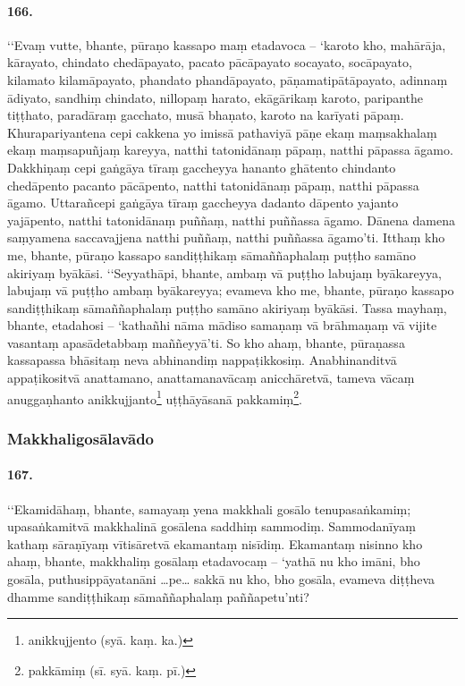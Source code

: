 \paragraph{166.} ‘‘Evaṃ vutte, bhante, pūraṇo kassapo maṃ etadavoca – ‘karoto kho, mahārāja, kārayato, chindato chedāpayato, pacato pācāpayato socayato, socāpayato, kilamato kilamāpayato, phandato phandāpayato, pāṇamatipātāpayato, adinnaṃ ādiyato, sandhiṃ chindato, nillopaṃ harato, ekāgārikaṃ karoto, paripanthe tiṭṭhato, paradāraṃ gacchato, musā bhaṇato, karoto na karīyati pāpaṃ. Khurapariyantena cepi cakkena yo imissā pathaviyā pāṇe ekaṃ maṃsakhalaṃ ekaṃ maṃsapuñjaṃ kareyya, natthi tatonidānaṃ pāpaṃ, natthi pāpassa āgamo. Dakkhiṇaṃ cepi gaṅgāya tīraṃ gaccheyya hananto ghātento chindanto chedāpento pacanto pācāpento, natthi tatonidānaṃ pāpaṃ, natthi pāpassa āgamo. Uttarañcepi gaṅgāya tīraṃ gaccheyya dadanto dāpento yajanto yajāpento, natthi tatonidānaṃ puññaṃ, natthi puññassa āgamo. Dānena damena saṃyamena saccavajjena natthi puññaṃ, natthi puññassa āgamo’ti. Itthaṃ kho me, bhante, pūraṇo kassapo sandiṭṭhikaṃ sāmaññaphalaṃ puṭṭho samāno akiriyaṃ byākāsi. ‘‘Seyyathāpi, bhante, ambaṃ vā puṭṭho labujaṃ byākareyya, labujaṃ vā puṭṭho ambaṃ byākareyya; evameva kho me, bhante, pūraṇo kassapo sandiṭṭhikaṃ sāmaññaphalaṃ puṭṭho samāno akiriyaṃ byākāsi. Tassa mayhaṃ, bhante, etadahosi – ‘kathañhi nāma mādiso samaṇaṃ vā brāhmaṇaṃ vā vijite vasantaṃ apasādetabbaṃ maññeyyā’ti. So kho ahaṃ, bhante, pūraṇassa kassapassa bhāsitaṃ neva abhinandiṃ nappaṭikkosiṃ. Anabhinanditvā appaṭikositvā anattamano, anattamanavācaṃ anicchāretvā, tameva vācaṃ anuggaṇhanto anikkujjanto\footnote{anikkujjento (syā. kaṃ. ka.)} uṭṭhāyāsanā pakkamiṃ\footnote{pakkāmiṃ (sī. syā. kaṃ. pī.)}.

\subsubsection{Makkhaligosālavādo}

\paragraph{167.} ‘‘Ekamidāhaṃ, bhante, samayaṃ yena makkhali gosālo tenupasaṅkamiṃ; upasaṅkamitvā makkhalinā gosālena saddhiṃ sammodiṃ. Sammodanīyaṃ kathaṃ sāraṇīyaṃ vītisāretvā ekamantaṃ nisīdiṃ. Ekamantaṃ nisinno kho ahaṃ, bhante, makkhaliṃ gosālaṃ etadavocaṃ – ‘yathā nu kho imāni, bho gosāla, puthusippāyatanāni …pe… sakkā nu kho, bho gosāla, evameva diṭṭheva dhamme sandiṭṭhikaṃ sāmaññaphalaṃ paññapetu’nti?

